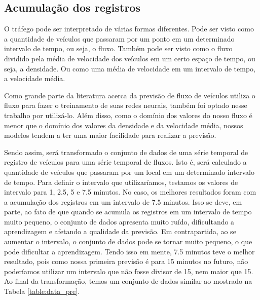 \subsection{Acumulação dos registros}

O tráfego pode ser interpretado de várias formas diferentes. Pode ser visto como a quantidade de veículos que passaram por um ponto em um determinado intervalo de tempo, ou seja, o fluxo. Também pode ser visto como o fluxo dividido pela média de velocidade dos veículos em um certo espaço de tempo, ou seja, a densidade. Ou como uma média de velocidade em um intervalo de tempo, a velocidade média.

Como grande parte da literatura acerca da previsão de fluxo de veículos utiliza o fluxo para fazer o treinamento de suas redes neurais, também foi optado nesse trabalho por utilizá-lo. Além disso, como o domínio dos valores do nosso fluxo é menor que o domínio dos valores da densidade e da velocidade média, nossos modelos tendem a ter uma maior facilidade para realizar a previsão.

Sendo assim, será transformado o conjunto de dados de uma série temporal de registro de veículos para uma série temporal de fluxos. Isto é, será calculado a quantidade de veículos que passaram por um local em um determinado intervalo de tempo. Para definir o intervalo que utilizaríamos, testamos os valores de intervalo para 1, 2.5, 5 e 7.5 minutos. No caso, os melhores resultados foram com a acumulação dos registros em um intervalo de 7.5 minutos. Isso se deve, em parte, ao fato de que quando se acumula os registros em um intervalo de tempo muito pequeno, o conjunto de dados apresenta muito ruído, dificultando a aprendizagem e afetando a qualidade da previsão. Em contrapartida, ao se aumentar o intervalo, o conjunto de dados pode se tornar muito pequeno, o que pode dificultar a aprendizagem. Tendo isso em mente, 7.5 minutos teve o melhor resultado, pois como nossa primeira previsão é para 15 minutos no futuro, não poderíamos utilizar um intervalo que não fosse divisor de 15, nem maior que 15. Ao final da transformação, temos um conjunto de dados similar ao mostrado na Tabela \ref{table:data_pre}.

